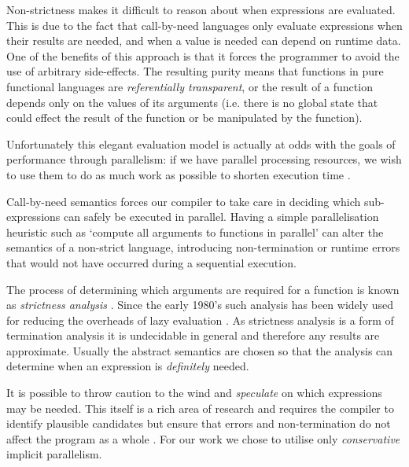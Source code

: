 Non-strictness makes it difficult to reason about when expressions are
evaluated. This is due to the fact that call-by-need languages only evaluate
expressions when their results are needed, and when a value is needed can
depend on runtime data. One of the benefits of this approach is that it forces
the programmer to avoid the use of arbitrary side-effects. The resulting purity
means that functions in pure functional languages are \emph{referentially
transparent}, or the result of a function depends only on the values of its
arguments (i.e.  there is no global state that could effect the result of the
function or be manipulated by the function).

Unfortunately this elegant evaluation model is actually at odds with the goals
of performance through parallelism: if we have parallel processing resources,
we wish to use them to do as much work as possible to shorten execution time
\citep{tremblay1995impact}.

Call-by-need semantics forces our compiler to take care in deciding which
sub-expressions can safely be executed in parallel. Having a simple
parallelisation heuristic such as `compute all arguments to functions in
parallel' can alter the semantics of a non-strict language, introducing
non-termination or runtime errors that would not have occurred during a
sequential execution.

The process of determining which arguments are required for a function is known
as \emph{strictness analysis} \citep{mycroft1980theory}. Since the early 1980's
such analysis has been widely used for reducing the overheads of lazy evaluation
\citep{SergeyDemand}. As strictness analysis is a form of termination analysis
it is undecidable in general and therefore any results are approximate. Usually
the abstract semantics are chosen so that the analysis can determine when
an expression is \emph{definitely} needed.

It is possible to throw caution to the wind and \emph{speculate} on which
expressions may be needed. This itself is a rich area of research and requires
the compiler to identify plausible candidates but ensure that errors and
non-termination do not affect the program as a whole . For our work we chose to utilise only \emph{conservative}
implicit parallelism.


